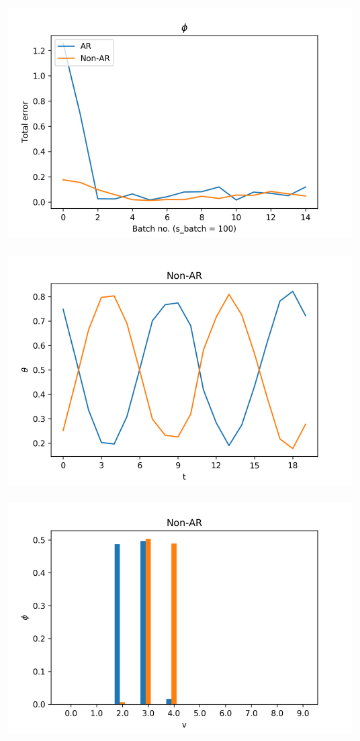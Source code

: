 \documentclass[12pt]{article}
\begin{document}
\begin{figure}[H]
\begin{subfigure}[b]{0.3\textwidth}
  \end{subfigure}%

  \begin{subfigure}[b]{0.3\textwidth}
    \includegraphics[width=\linewidth]{performance_phis_experiment-1|overlapping-yes_dataset-6.png}
  \end{subfigure}%
  \begin{subfigure}[b]{0.3\textwidth}
    \includegraphics[width=\linewidth]{latent_thetas_Non-AR_experiment-1|overlapping-yes_dataset-6.png}
  \end{subfigure}%
  \begin{subfigure}[b]{0.3\textwidth}
    \includegraphics[width=\linewidth]{latent_phis_Non-AR_experiment-1|overlapping-yes_dataset-6.png}

\end{subfigure}
\end{figure}
\end{document}
